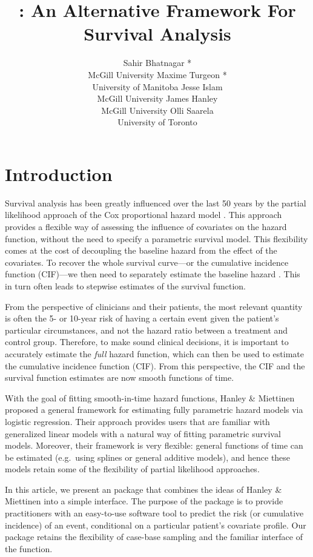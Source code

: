 \documentclass[
]{jss}
\author{
Sahir Bhatnagar *\\McGill University \And Maxime Turgeon *\\University
of Manitoba \AND Jesse Islam\\McGill University \And James
Hanley\\McGill University \And Olli Saarela\\University of Toronto
}
\title{\pkg{casebase}: An Alternative Framework For Survival Analysis}
\begin{document}
\hypertarget{introduction}{%
\section{Introduction}\label{introduction}}

Survival analysis has been greatly influenced over the last 50 years by
the partial likelihood approach of the Cox proportional hazard model
\citep{cox1972regression}. This approach provides a flexible way of
assessing the influence of covariates on the hazard function, without
the need to specify a parametric survival model. This flexibility comes
at the cost of decoupling the baseline hazard from the effect of the
covariates. To recover the whole survival curve---or the cumulative
incidence function (CIF)---we then need to separately estimate the
baseline hazard \citep{breslow1972discussion}. This in turn often leads
to stepwise estimates of the survival function.

From the perspective of clinicians and their patients, the most relevant
quantity is often the 5- or 10-year risk of having a certain event given
the patient's particular circumstances, and not the hazard ratio between
a treatment and control group. Therefore, to make sound clinical
decisions, it is important to accurately estimate the \emph{full} hazard
function, which can then be used to estimate the cumulative incidence
function (CIF). From this perspective, the CIF and the survival function
estimates are now smooth functions of time.

With the goal of fitting smooth-in-time hazard functions, Hanley \&
Miettinen \citeyearpar{hanley2009fitting} proposed a general framework
for estimating fully parametric hazard models via logistic regression.
Their approach provides users that are familiar with generalized linear
models with a natural way of fitting parametric survival models.
Moreover, their framework is very flexible: general functions of time
can be estimated (e.g.~using splines or general additive models), and
hence these models retain some of the flexibility of partial likelihood
approaches.

In this article, we present an  package that combines the
ideas of Hanley \& Miettinen into a simple interface. The purpose of the
 package is to provide practitioners with an easy-to-use
software tool to predict the risk (or cumulative incidence) of an event,
conditional on a particular patient's covariate profile. Our package
retains the flexibility of case-base sampling and the familiar interface
of the  function.
\end{document}
